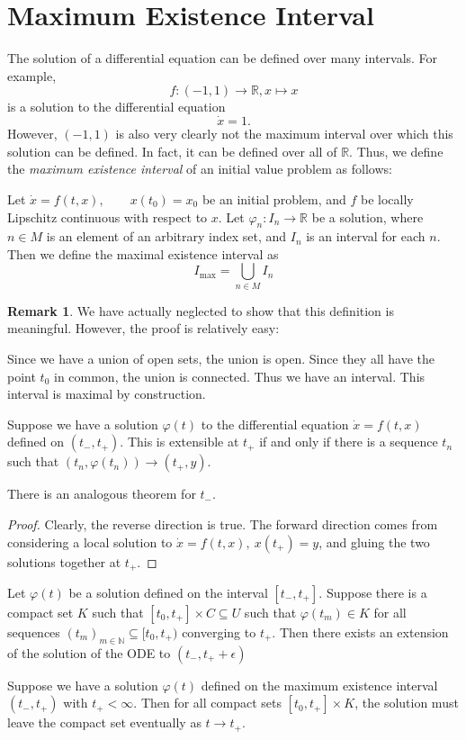 \documentclass[prb,12pt]{revtex4-2}
\theoremstyle{definition}
\newtheorem{Remark}[Theorem]{Remark}
\theoremstyle{definition}
\theoremstyle{definition}
\newcommand{\N}{\mathbb{N}}
\newcommand{\R}{\mathbb{R}}
\begin{document}
\section{Maximum Existence Interval}
The solution of a differential equation can be defined over many intervals. For example,
\[f: (-1,1)\to \R, x\mapsto x\]
is a solution to the differential equation
\[\dot{x}=1.\]
However, $(-1,1)$ is also very clearly not the maximum interval over which this solution can be defined. In fact, it can be defined over all of $\R$. Thus, we define the \emph{maximum existence interval} of an initial value problem as follows:
\begin{Definition}
	Let $\dot{x}=f(t,x),\qquad x(t_0)=x_0$ be an initial problem, and $f$ be locally Lipschitz continuous with respect to $x$. Let $\varphi_n:I_n\to \R$ be a solution, where $n\in M$ is an element of an arbitrary index set, and $I_n$ is an interval for each $n$. Then we define the maximal existence interval as
	\[I_\text{max}=\bigcup_{n\in M}I_n\]
\end{Definition}
\begin{Remark}
	We have actually neglected to show that this definition is meaningful. However, the proof is relatively easy:
	
	Since we have a union of open sets, the union is open. Since they all have the point $t_0$ in common, the union is connected. Thus we have an interval. This interval is maximal by construction.
\end{Remark}
\begin{Theorem}
	Suppose we have a solution $\varphi(t)$ to the differential equation $\dot{x}=f(t, x)$ defined on $(t_{-}, t_+)$. This is extensible at $t_+$ if and only if there is a sequence $t_n$ such that $(t_n, \varphi(t_n))\to (t_+, y)$.
	
	There is an analogous theorem for $t_-$.
\end{Theorem}
\begin{proof}
	Clearly, the reverse direction is true. The forward direction comes from considering a local solution to $\dot{x}=f(t, x),~x(t_+)=y$, and gluing the two solutions together at $t_+$.
\end{proof}
\begin{Corollary}
	Let $\varphi(t)$ be a solution defined on the interval $[t_-, t_+]$. Suppose there is a compact set $K$ such that $[t_0, t_+]\times C \subseteq U$ such that $\varphi(t_m)\in K$ for all sequences $(t_m)_{m\in \N}\subseteq [t_0, t_+)$ converging to $t_+$. Then there exists an extension of the solution of the ODE to $(t_-, t_+ +\epsilon)$
\end{Corollary}
\begin{Corollary}
	Suppose we have a solution $\varphi(t)$ defined on the maximum existence interval $(t_-, t_+)$ with $t_+<\infty$. Then for all compact sets $[t_0, t_+]\times K$, the solution must leave the compact set eventually as $t\to t_+$.
\end{Corollary}
\end{document}
